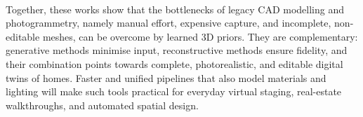 \documentclass[12pt,a4paper,final]{extreport}
\begin{document}
\paragraph{} Together, these works show that the bottlenecks of legacy CAD modelling and photogrammetry, namely manual effort, expensive capture, and incomplete, non-editable meshes, can be overcome by learned 3D priors. They are complementary: generative methods minimise input, reconstructive methods ensure fidelity, and their combination points towards complete, photorealistic, and editable digital twins of homes. Faster and unified pipelines that also model materials and lighting will make such tools practical for everyday virtual staging, real-estate walkthroughs, and automated spatial design.

\begingroup
{}
\end{document}
